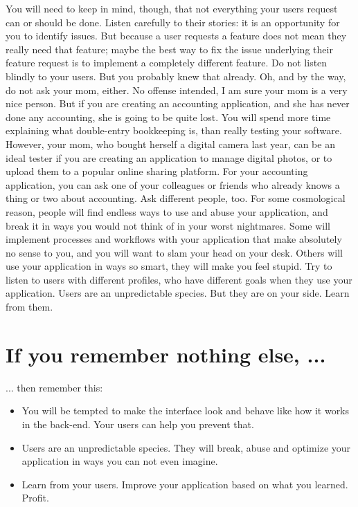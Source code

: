 You will need to keep in mind, though, that not everything your users request can or should be done. Listen carefully to their stories: it is an opportunity for you to identify issues. But because a user requests a feature does not mean they really need that feature; maybe the best way to fix the issue underlying their feature request is to implement a completely different feature. Do not listen blindly to your users. But you probably knew that already. 
\newline
Oh, and by the way, do not ask your mom, either.
\newline
No offense intended, I am sure your mom is a very nice person. But if you are creating an accounting application, and she has never done any accounting, she is going to be quite lost. You will spend more time explaining what double-entry bookkeeping is, than really testing your software. However, your mom, who bought herself a digital camera last year, can be an ideal tester if you are creating an application to manage digital photos, or to upload them to a popular online sharing platform. For your accounting application, you can ask one of your colleagues or friends who already knows a thing or two about accounting.
\newline
Ask different people, too.
\newline
For some cosmological reason, people will find endless ways to use and abuse your application, and break it in ways you would not think of in your worst nightmares. Some will implement processes and workflows with your application that make absolutely no sense to you, and you will want to slam your head on your desk. Others will use your application in ways so smart, they will make you feel stupid. Try to listen to users with different profiles, who have different goals when they use your application.
\newline
Users are an unpredictable species. But they are on your side. Learn from them.

\section*{If you remember nothing else, ...}
... then remember this:
\begin{itemize}
 \item You will be tempted to make the interface look and behave like how it works in the back-end. Your users can help you prevent that.
 \item Users are an unpredictable species. They will break, abuse and optimize your application in ways you can not even imagine.
 \item Learn from your users. Improve your application based on what you learned. Profit.
\end{itemize}

